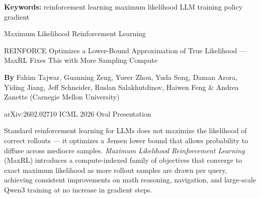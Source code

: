 \documentclass[10pt,twocolumn]{article}
\begin{document}
\setlength{\parindent}{0pt}
\setlength{\parskip}{4pt}

{\small\color{keywordgray}\textbf{Keywords:}
  reinforcement learning \textbullet{}
  maximum likelihood \textbullet{}
  LLM training \textbullet{}
  policy gradient}\par\vspace{4pt}

{\LARGE\bfseries\raggedright
  Maximum Likelihood Reinforcement Learning}\par\vspace{4pt}

{\large\itshape\raggedright
  REINFORCE Optimizes a Lower-Bound Approximation of True Likelihood ---
  MaxRL Fixes This with More Sampling Compute}\par\vspace{6pt}

{\small\textbf{By} Fahim Tajwar, Guanning Zeng, Yueer Zhou, Yuda Song,
  Daman Arora, Yiding Jiang, Jeff Schneider, Ruslan Salakhutdinov,
  Haiwen Feng \& Andrea Zanette (Carnegie Mellon University)}\par\vspace{2pt}

{\small\color{keywordgray}arXiv:2602.02710 \textbullet{}
  ICML 2026 Oral Presentation}
\par\vspace{2pt}\noindent{\color{rulered}\rule{\columnwidth}{0.6pt}}\vspace{6pt}

Standard reinforcement learning for LLMs does not maximize the likelihood
of correct rollouts --- it optimizes a Jensen lower bound that allows
probability to diffuse across mediocre samples. \textit{Maximum Likelihood
Reinforcement Learning} (MaxRL) introduces a compute-indexed family of
objectives that converge to exact maximum likelihood as more rollout samples
are drawn per query, achieving consistent improvements on math reasoning,
navigation, and large-scale Qwen3 training at no increase in gradient steps.
\end{document}
